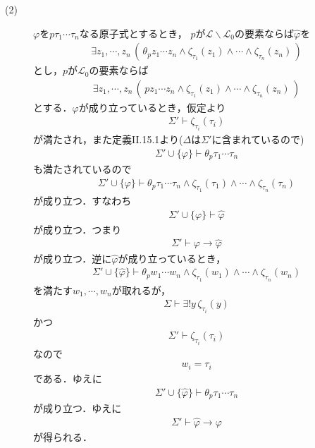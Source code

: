 \begin{description}
		\item[(2)]
			$\varphi$を$p\tau_{1}\cdots\tau_{n}$なる原子式とするとき，
			$p$が$\mathcal{L} \backslash \mathcal{L}_{0}$の要素ならば$\hat{\varphi}$を
			\begin{align}
				\exists z_{1},\cdots,z_{n}\, 
				\left(\, \theta_{p}z_{1} \cdots z_{n} \wedge \zeta_{\tau_{1}}(z_{1})
				\wedge \cdots \wedge \zeta_{\tau_{n}}(z_{n})\, \right)
			\end{align}
			とし，$p$が$\mathcal{L}_{0}$の要素ならば
			\begin{align}
				\exists z_{1},\cdots,z_{n}\, 
				\left(\, pz_{1} \cdots z_{n} \wedge \zeta_{\tau_{1}}(z_{1})
				\wedge \cdots \wedge \zeta_{\tau_{n}}(z_{n})\, \right)
			\end{align}
			とする．$\varphi$が成り立っているとき，仮定より
			\begin{align}
				\Sigma' \vdash \zeta_{\tau_{i}}(\tau_{i})
			\end{align}
			が満たされ，また定義I\hspace{-.1em}I.15.1より($\Delta$は$\Sigma'$に含まれているので)
			\begin{align}
				\Sigma' \cup \{\varphi\} \vdash \theta_{p}\tau_{1} \cdots \tau_{n}
			\end{align}
			も満たされているので
			\begin{align}
				\Sigma' \cup \{\varphi\} \vdash \theta_{p}\tau_{1} \cdots \tau_{n}
				\wedge \zeta_{\tau_{1}}(\tau_{1}) \wedge \cdots \wedge 
				\zeta_{\tau_{n}}(\tau_{n})
			\end{align}
			が成り立つ．すなわち
			\begin{align}
				\Sigma' \cup \{\varphi\} \vdash \hat{\varphi}
			\end{align}
			が成り立つ．つまり
			\begin{align}
				\Sigma' \vdash \varphi \rightarrow \hat{\varphi}
			\end{align}
			が成り立つ．逆に$\hat{\varphi}$が成り立っているとき，
			\begin{align}
				\Sigma' \cup \{\hat{\varphi}\} \vdash \theta_{p}w_{1} \cdots w_{n}
				\wedge \zeta_{\tau_{1}}(w_{1}) \wedge \cdots \wedge 
				\zeta_{\tau_{n}}(w_{n})
			\end{align}
			を満たす$w_{1},\cdots,w_{n}$が取れるが，
			\begin{align}
				\Sigma \vdash \exists! y\, \zeta_{\tau_{i}}(y)
			\end{align}
			かつ
			\begin{align}
				\Sigma' \vdash \zeta_{\tau_{i}}(\tau_{i})
			\end{align}
			なので
			\begin{align}
				w_{i} = \tau_{i}
			\end{align}
			である．ゆえに
			\begin{align}
				\Sigma' \cup \{\hat{\varphi}\} \vdash \theta_{p}\tau_{1} \cdots \tau_{n}
			\end{align}
			が成り立つ．ゆえに
			\begin{align}
				\Sigma' \vdash \hat{\varphi} \rightarrow \varphi
			\end{align}
			が得られる．
			\QED
	\end{description}
	
